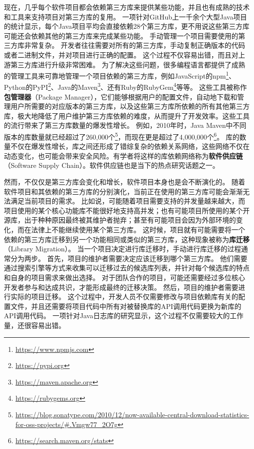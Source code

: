 \documentclass[UTF8]{ctexart}
\begin{document}
现在，几乎每个软件项目都会依赖第三方库来提供某些功能，并且也有成熟的技术和工具来支持项目对第三方库的复用。
一项针对GitHub上一千余个大型Java项目的统计显示，每个Java项目平均会直接依赖28个第三方库\cite{2013WCRE-Thung-Automated}，更不用说这些第三方库可能还会依赖其他的第三方库来完成某些功能。
手动管理一个项目需要使用的第三方库非常复杂。
开发者往往需要对所有的第三方库，手动复制正确版本的代码或者二进制文件，并对项目进行正确的配置。
这个过程不仅容易出错，而且对上游第三方库进行升级非常困难。
为了解决这些问题，很多编程语言都提供了成熟的管理工具来可靠地管理一个项目依赖的第三方库，例如JavaScript的npm\footnote{\url{https://www.npmjs.com}}、Python的PyPI\footnote{\url{https://pypi.org}}、Java的Maven\footnote{\url{https://maven.apache.org}}、还有Ruby的RubyGem\footnote{\url{https://rubygems.org}}等等。
这些工具被称作\textbf{包管理器}（Package Manager），它们能够根据用户的配置文件，自动地下载和管理用户所需要的对应版本的第三方库，以及这些第三方库所依赖的所有其他第三方库，极大地降低了用户维护第三方库依赖的难度，从而提升了开发效率。这些工具的流行带来了第三方库数量的爆发性增长。
例如，2010年时，Java Maven中不同版本的库数量就已经超过了260,000个\footnote{\url{https://blog.sonatype.com/2010/12/now-available-central-download-statistics-for-oss-projects/#.Vmgw77_2O7g}}，而现在更是超过了4,000,000个\footnote{\url{https://search.maven.org/stats}}。
库的数量不仅在爆发性增长，库之间还形成了错综复杂的依赖关系网络，这些网络不仅在动态变化，也可能会带来安全风险\cite{2017MSR-Kikas-Structure, 2018ICSME-Zapata-Towards}。有学者将这样的库依赖网络称为\textbf{软件供应链}（Software Supply Chain）\cite{2019FSE-Mockus-SoftwareSupplyChain}。软件供应链也是当下的热点研究话题之一。

然而，不仅仅是第三方库会变化和增长，软件项目本身也是会不断演化的。
随着软件项目和其依赖的第三方库的分别演化，当前正在使用的第三方库可能会渐渐无法满足当前项目的需求。
比如说，可能随着项目需要支持的并发量越来越大，而项目使用的某个核心功能库不能很好地支持高并发；也有可能项目所使用的某个开源库，出于种种原因最终被其维护者抛弃\cite{2017FSE-Coelho-Why, 2018FSE-Valiev-Ecosystem}；甚至有可能项目会因为外部环境的变化，而在法律上不能继续使用某个第三方库。
这时候，项目就有可能需要将一个依赖的第三方库迁移到另一个功能相同或类似的第三方库，这种现象被称为\textbf{库迁移}（Library Migration）。
当一个项目决定进行库迁移时，手动进行库迁移的过程通常分为两步。
首先，项目的维护者需要决定应该迁移到哪个第三方库。
他们需要通过搜索引擎等方式来收集可以迁移过去的候选库列表，并针对每个候选库的特点和自身的项目需求来做出选择。
对于团队合作的项目，可能还需要经过多位核心开发者参与和达成共识，才能形成最终的迁移决策\cite{2016MSR-Kabinna-Logging}。
然后，项目的维护者需要进行实际的项目迁移。
这个过程中，开发人员不仅需要修改与项目依赖库有关的配置文件，并且还需要将项目代码中所有对被替换库的API调用代码更换为新库的API调用代码。
一项针对Java日志库的研究显示，这个过程不仅需要较大的工作量，还很容易出错\cite{2016MSR-Kabinna-Logging}。
\end{document}
